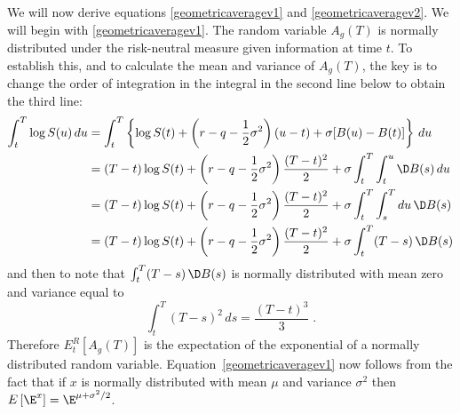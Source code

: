 \begin{petit}
We will now derive equations \eqref{geometricaveragev1} and \eqref{geometricaveragev2}.  We will begin with \eqref{geometricaveragev1}.
The random variable $A_g(T)$  is normally distributed under the risk-neutral measure given information at time $t$.  To establish this, and to calculate the mean and variance of $A_g(T)$, the key is to change the order of integration in the integral in the second line below to obtain the third line:
\begin{align*}
\int_t^T \log S(u)\,du &= \int_t^T \left\{\log S(t) + \left(r-q-\frac{1}{2}\sigma^2\right)(u-t) + \sigma [B(u)-B(t)]\right\}\,du\\
&= (T-t)\log S(t) + \left(r-q-\frac{1}{2}\sigma^2\right)\frac{(T-t)^2}{2} + \sigma\int_t^T \int_t^u \D B(s)\,du\\
&= (T-t)\log S(t) + \left(r-q-\frac{1}{2}\sigma^2\right)\frac{(T-t)^2}{2} + \sigma\int_t^T \int_s^T du\,\D B(s)\\
&= (T-t)\log S(t) + \left(r-q-\frac{1}{2}\sigma^2\right)\frac{(T-t)^2}{2} + \sigma\int_t^T (T-s)\,\D B(s)
\end{align*}
and then to note that $\int_t^T (T-s)\,\D B(s)$ is normally distributed with mean zero and variance equal to 
$$\int_t^T (T-s)^2\,ds =\frac{(T-t)^3}{3}\; .$$
Therefore $E^R_t\left[A_g(T)\right]$ is the expectation of the exponential of a normally distributed random variable.  Equation~\eqref{geometricaveragev1} now follows from the fact that if $x$ is normally distributed with mean $\mu$ and variance $\sigma^2$ then $E\left[\E^x\right] = \E^{\mu+\sigma^2/2}$.  



\end{petit}
